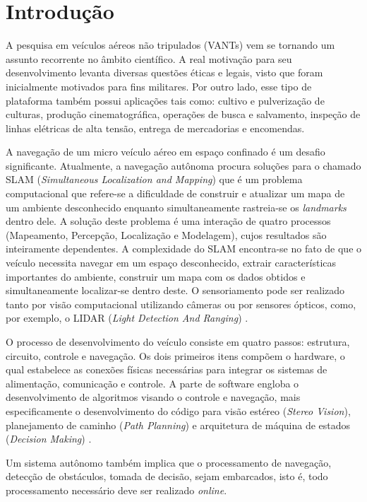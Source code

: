 \chapter{Introdução}
\label{Introducao}

A pesquisa em veículos aéreos não tripulados (VANTs) vem se tornando um assunto recorrente no âmbito científico. A real motivação para seu desenvolvimento levanta diversas questões éticas e legais, visto que foram inicialmente motivados para fins militares. Por outro lado, esse tipo de plataforma também possui aplicações tais como: cultivo e pulverização de culturas, produção cinematográfica, operações de busca e salvamento, inspeção de linhas elétricas de alta tensão, entrega de mercadorias e encomendas.

A navegação de um micro veículo aéreo em espaço confinado é um desafio significante. Atualmente, a navegação autônoma procura soluções para o chamado SLAM (\textit{Simultaneous Localization and Mapping}) \cite{Dissanayake2001} que é um problema computacional que refere-se a dificuldade de construir e atualizar um mapa de um ambiente desconhecido enquanto simultaneamente rastreia-se os \textit{landmarks} dentro dele. A solução deste problema é uma interação de quatro processos (Mapeamento, Percepção, Localização e Modelagem), cujos resultados são inteiramente dependentes. A complexidade do SLAM encontra-se no fato de que o veículo necessita navegar em um espaço desconhecido, extrair características importantes do ambiente, construir um mapa com os dados obtidos e simultaneamente localizar-se dentro deste. O sensoriamento pode ser realizado tanto por visão computacional utilizando câmeras ou por sensores ópticos, como, por exemplo, o LIDAR (\textit{Light Detection And Ranging}) \cite{Barry2015}. 

O processo de desenvolvimento do veículo consiste em quatro passos: estrutura, circuito, controle e navegação. Os dois primeiros itens compõem o hardware, o qual estabelece as conexões físicas necessárias para integrar os sistemas de alimentação, comunicação e controle. A parte de software engloba o desenvolvimento de algoritmos visando o controle e navegação, mais especificamente o desenvolvimento do código para visão estéreo (\textit{Stereo Vision}), planejamento de caminho (\textit{Path Planning}) e arquitetura de máquina de estados (\textit{Decision Making}) \cite{Lemaire2007}.

Um sistema autônomo também implica que o processamento de navegação, detecção de obstáculos, tomada de decisão, sejam embarcados, isto é, todo processamento necessário deve ser realizado \textit{online}. 

